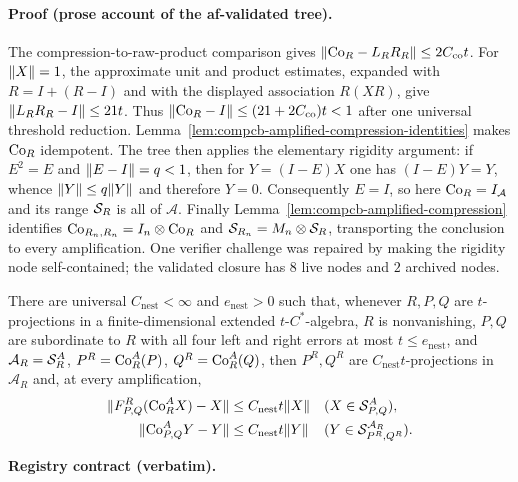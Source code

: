 \paragraph{Proof (prose account of the af-validated tree).}
The compression-to-raw-product comparison gives
$\lVert \mathrm{Co}_{R}-L_RR_R\rVert\le2C_{\mathrm{co}}t$. For $\lVert X\rVert=1$, the approximate unit and
product estimates, expanded with $R=I+(R-I)$ and with the displayed association
$R(XR)$, give $\lVert L_RR_R-I\rVert\le21t$. Thus
$\lVert \mathrm{Co}_{R}-I\rVert\le(21+2C_{\mathrm{co}})t<1$ after one universal threshold reduction.
Lemma~\ref{lem:compcb-amplified-compression-identities} makes $\mathrm{Co}_{R}$ idempotent.
The tree then applies the elementary rigidity argument: if $E^2=E$ and
$\lVert E-I\rVert=q<1$, then for $Y=(I-E)X$ one has $(I-E)Y=Y$, whence
$\lVert Y\rVert\le q\lVert Y\rVert$ and therefore $Y=0$. Consequently $E=I$, so here
$\mathrm{Co}_{R}=I_{\mathcal A}$ and its range $\mathcal S_{R}$ is all of $\mathcal A$.
Finally Lemma~\ref{lem:compcb-amplified-compression} identifies
$\mathrm{Co}_{R_n,R_n}=I_n\otimes\mathrm{Co}_{R}$ and $\mathcal S_{R_n}=M_n\otimes\mathcal S_{R}$,
transporting the conclusion to every amplification. One verifier challenge was repaired
by making the rigidity node self-contained; the validated closure has $8$ live nodes
and $2$ archived nodes.

\begin{lemma}\label{lem:maincb-nested-corner-comparison}
There are universal $C_{\mathrm{nest}}<\infty$ and $e_{\mathrm{nest}}>0$ such that,
whenever $R,P,Q$ are $t$-projections in a finite-dimensional extended $t$-$C^*$-algebra,
$R$ is nonvanishing, $P,Q$ are subordinate to $R$ with all four left and right errors
at most $t\le e_{\mathrm{nest}}$, and
$\mathcal A_R=\mathcal S_{R}^A$, $P^R=\mathrm{Co}_{R}^A(P)$, $Q^R=\mathrm{Co}_{R}^A(Q)$, then $P^R,Q^R$ are
$C_{\mathrm{nest}}t$-projections in $\mathcal A_R$ and, at every amplification,
\begin{align*}
 \lVert F^R_{P,Q}(\mathrm{Co}_{R}^A X)-X\rVert&\le C_{\mathrm{nest}}t\lVert X\rVert
   &&(X\in\mathcal S_{P,Q}^A),\\
 \lVert \mathrm{Co}_{P,Q}^A Y-Y\rVert&\le C_{\mathrm{nest}}t\lVert Y\rVert
   &&(Y\in\mathcal S_{P^R,Q^R}^{\mathcal A_R}).
\end{align*}
\end{lemma}
\noindent\textbf{Registry contract (verbatim).}
